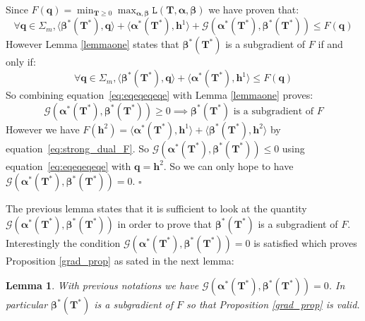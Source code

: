 \documentclass{article}
\newcommand{\scalar}[2]{\langle #1 , #2 \rangle}
\def\eqref#1{equation~\ref{#1}}
\def\vh{{\bm{h}}}
\def\mT{{\bm{T}}}
\def\alphab{\boldsymbol\alpha}
\def\betab{\boldsymbol\beta}
\newcommand{\qbf}{\mathbf{q}}
\newtheorem{lemma}{Lemma}
\begin{document}
	Since $F(\qbf)=\min_{\mT \geq 0} \max_{\alphab,\betab} \texttt{L}(\mT,\alphab,\betab)$ we have proven that:
	\begin{equation}
	\label{eq:eqeqeqeqe}
	\forall \qbf \in \Sigma_m, \scalar{\betab^{*}(\mT^{*})}{\qbf}{}+\scalar{\alphab^{*}(\mT^{*})}{\vh^1}{}+\mathcal{G}(\alphab^{*}(\mT^{*}),\betab^{*}(\mT^{*}))\leq F(\qbf)
	\end{equation} 
	However Lemma \ref{lemmaone} states that $\betab^{*}(\mT^{*})$ is a subgradient of $F$ if and only if:
	\begin{equation}
	\forall \qbf \in \Sigma_m, \scalar{\betab^{*}(\mT^{*})}{\qbf}{}+\scalar{\alphab^{*}(\mT^{*})}{\vh^1}{}\leq F(\qbf)
	\end{equation} 
	So combining \eqref{eq:eqeqeqeqe} with Lemma \ref{lemmaone} proves:
	\begin{equation}
	\mathcal{G}(\alphab^{*}(\mT^{*}),\betab^{*}(\mT^{*})) \geq 0 \implies \betab^{*}(\mT^{*}) \text{ is a subgradient of } F
	\end{equation}
	However we have $F(\vh^2)=\scalar{\alphab^{*}(\mT^{*})}{\vh^1}{}+\scalar{\betab^{*}(\mT^{*})}{\vh^2}{}$ by \eqref{eq:strong_dual_F}. So $\mathcal{G}(\alphab^{*}(\mT^{*}),\betab^{*}(\mT^{*}))\leq 0$ using \eqref{eq:eqeqeqeqe} with $\qbf=\vh^2$. So we can only hope to have $\mathcal{G}(\alphab^{*}(\mT^{*}),\betab^{*}(\mT^{*}))= 0$. 
	$\square$
	
	The previous lemma states that it is sufficient to look at the quantity $\mathcal{G}(\alphab^{*}(\mT^{*}),\betab^{*}(\mT^{*}))$ in order to prove that $\betab^{*}(\mT^{*})$ is a subgradient of $F$. Interestingly the condition $\mathcal{G}(\alphab^{*}(\mT^{*}),\betab^{*}(\mT^{*}))=0$ is satisfied which proves Proposition \ref{grad_prop} as sated in the next lemma:
	\begin{lemma}
		With previous notations we have $\mathcal{G}(\alphab^{*}(\mT^{*}),\betab^{*}(\mT^{*}))=0$. In particular $\betab^{*}(\mT^{*})$ is a subgradient of $F$ so that Proposition \ref{grad_prop} is valid. 
	\end{lemma}
	
\end{document}
